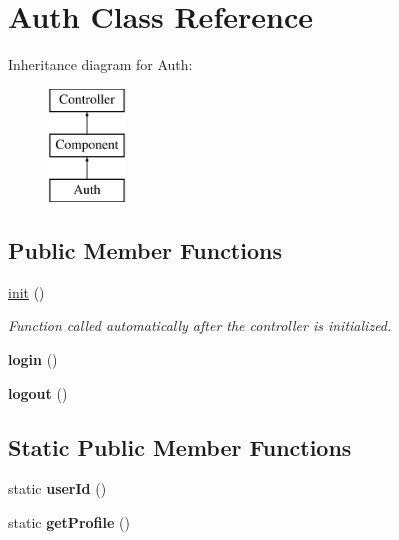 \hypertarget{class_auth}{
\section{Auth Class Reference}
\label{class_auth}
}
Inheritance diagram for Auth:\begin{figure}[H]
\begin{center}
\leavevmode
\includegraphics[height=3.000000cm]{class_auth}
\end{center}
\end{figure}
\subsection*{Public Member Functions}
\begin{DoxyCompactItemize}
\item 
\hyperlink{class_auth_a57c4bdd2e34ab7f4535d3df47d96fadd}{init} ()
\begin{DoxyCompactList}\small\item\em Function called automatically after the controller is initialized. \item\end{DoxyCompactList}\item 
\hypertarget{class_auth_a6cdbbc10479b386eebe501d4d2779000}{
{\bfseries login} ()}
\label{class_auth_a6cdbbc10479b386eebe501d4d2779000}

\item 
\hypertarget{class_auth_acbbcb54916a234d1d816ec85e4a88d5e}{
{\bfseries logout} ()}
\label{class_auth_acbbcb54916a234d1d816ec85e4a88d5e}

\end{DoxyCompactItemize}
\subsection*{Static Public Member Functions}
\begin{DoxyCompactItemize}
\item 
\hypertarget{class_auth_a25759fd39bdc92a4d0005a23d935ceb0}{
static {\bfseries userId} ()}
\label{class_auth_a25759fd39bdc92a4d0005a23d935ceb0}

\item 
\hypertarget{class_auth_a9ab2e1d7a75d85032e0e00ee24fb1b79}{
static {\bfseries getProfile} ()}
\label{class_auth_a9ab2e1d7a75d85032e0e00ee24fb1b79}

\end{DoxyCompactItemize}
